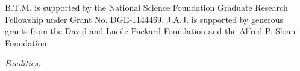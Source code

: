 \documentclass{emulateapj}
\newcommand{\todo}[3]{{\color{#2} \emph{#1} TO DO: #3}}
\newcommand{\btmtodo}[1]{\todo{BEN}{red}{#1}}
\begin{document}
B.T.M. is supported by the National Science Foundation Graduate Research
Fellowship under Grant No. DGE‐1144469. 
J.A.J. is supported by generous grants from the David and Lucile Packard
Foundation and the Alfred P. Sloan Foundation.



{\it Facilities:} %









\end{document}
